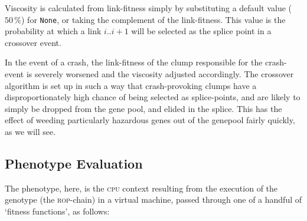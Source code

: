 Viscosity is calculated from link-fitness simply by substituting
a default value ($50\,\%$) for \texttt{None}, or taking the
complement of the link-fitness. This value is the probability at
which a link $i..i+1$ will be selected as the splice point in a
crossover event. 

In the event of a crash, the link-fitness of the clump
responsible for the crash-event is severely worsened
and the viscosity adjusted accordingly. The crossover algorithm
is set up in such a way that crash-provoking clumps have a
disproportionately high chance of being selected as
splice-points, and are likely to simply be dropped from the gene
pool, and elided in the splice. This has the effect of weeding
particularly hazardous genes out of the genepool fairly quickly,
as we will see. 






\subsection{Phenotype Evaluation}
The phenotype, here, is the \textsc{cpu} context resulting from the execution of the genotype (the \textsc{rop}-chain) in a virtual machine, passed through one of a handful of `fitness functions', as follows:
